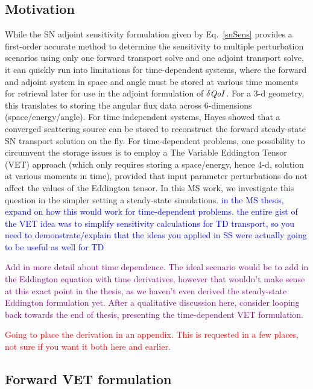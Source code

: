 \documentclass[12pt]{report}
\newcommand{\qoi}{{\it QoI}\xspace}
\newcommand{\comment}[2]{\marginpar{\textcolor{#2}{$\star$}}\textcolor{#2}{#1}\newline}
\newcommand{\iwh}[1]{\comment{#1}{red}}
\newcommand{\jcr}[1]{\comment{#1}{blue}}
\newcommand{\todo}[1]{\comment{#1}{purple}}
\newcommand{\iwh}[1]{\phantom{a}}
\newcommand{\jcr}[1]{\phantom{a}}
\newcommand{\todo}[1]{\phantom{a}}
\begin{document}
\subsection{Motivation} 
While the SN adjoint sensitivity formulation given by Eq.~\eqref{snSens} provides a first-order accurate method to determine the sensitivity to multiple perturbation scenarios using only one forward transport solve and one adjoint transport solve, it can quickly run into limitations for time-dependent systems, where the forward and adjoint system in space and angle must be stored at various time moments for retrieval later for use in the adjoint formulation of $\delta \qoi$. For a 3-d geometry, this translates to storing the angular
flux data across 6-dimensions (space/energy/angle). For time independent systems, Hayes \cite{Stripling} showed that a converged scattering source can be stored to reconstruct 
the forward steady-state SN transport solution on the fly. For time-dependent problems, one possibility to circumvent the storage issues is to employ a The Variable Eddington Tensor (VET) approach (which only requires
storing a space/energy, hence 4-d, solution at various moments in time), provided that input parameter perturbations do not affect the values of the Eddington tensor. In this MS work,
we investigate this question in the simpler setting a steady-state simulations.
\jcr{in the MS thesis, expand on how this would work for time-dependent problems. the entire
gist of the VET idea was to simplify sensitivity calculations for TD transport, so you need
to demonstrate/explain that the ideas you applied in SS were actually going to be useful as well for TD}

\todo{Add in more detail about time dependence. The ideal scenario would be to add in the Eddington equation with time derivatives, however that wouldn't make sense at this exact point in the thesis, as we haven't even derived the steady-state Eddington formulation yet. After a qualitative discussion here, consider looping back towards the end of thesis, presenting the time-dependent VET formulation.}

\iwh{Going to place the derivation in an appendix. This is requested in a few places, not sure if you want it both here and earlier.}

\subsection{Forward VET formulation}
\end{document}
